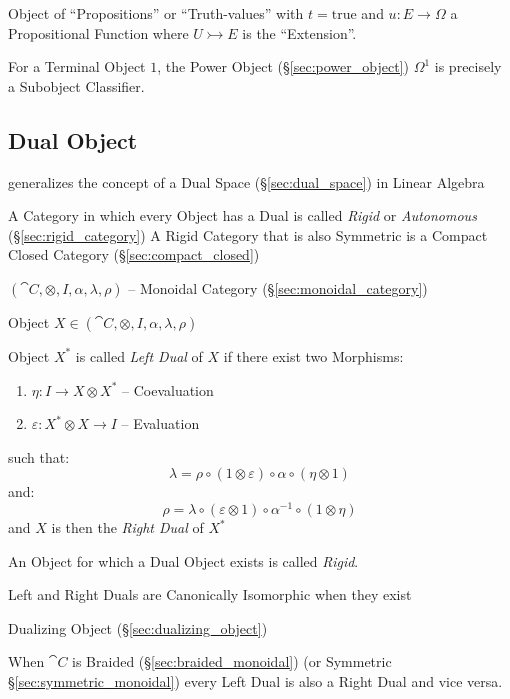 Object of ``Propositions'' or ``Truth-values'' with $t =
\mathrm{true}$ and $u : E \rightarrow \Omega$ a Propositional Function
where $U \rightarrowtail E$ is the ``Extension''.

For a Terminal Object $1$, the Power Object (\S\ref{sec:power_object})
$\Omega^1$ is precisely a Subobject Classifier.



\subsection{Dual Object}\label{sec:dual_object}

generalizes the concept of a Dual Space (\S\ref{sec:dual_space}) in
Linear Algebra

A Category in which every Object has a Dual is called \emph{Rigid} or
\emph{Autonomous} (\S\ref{sec:rigid_category}) A Rigid Category that
is also Symmetric is a Compact Closed Category
(\S\ref{sec:compact_closed})

$(\cat{C}, \otimes, I, \alpha, \lambda, \rho)$ -- Monoidal Category
(\S\ref{sec:monoidal_category})

Object $X \in (\cat{C}, \otimes, I, \alpha, \lambda, \rho)$

Object $X^*$ is called \emph{Left Dual} of $X$ if there exist two
Morphisms:
\begin{enumerate}
  \item $\eta : I \rightarrow X \otimes X^*$ -- Coevaluation
  \item $\varepsilon : X^* \otimes X \rightarrow I$ -- Evaluation
\end{enumerate}
such that:
\[
  \lambda = \rho \circ (1 \otimes \varepsilon) \circ \alpha \circ
    (\eta \otimes 1)
\]
and:
\[
  \rho = \lambda \circ (\varepsilon \otimes 1) \circ \alpha^{-1}
    \circ (1 \otimes \eta)
\]
and $X$ is then the \emph{Right Dual} of $X^*$

An Object for which a Dual Object exists is called \emph{Rigid}.

Left and Right Duals are Canonically Isomorphic when they exist

Dualizing Object (\S\ref{sec:dualizing_object})

When $\cat{C}$ is Braided (\S\ref{sec:braided_monoidal}) (or Symmetric
\S\ref{sec:symmetric_monoidal}) every Left Dual is also a Right Dual
and vice versa.


